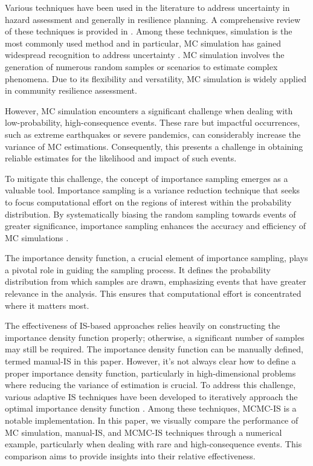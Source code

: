     Various techniques have been used in the literature to address uncertainty in hazard assessment and generally in resilience planning. A comprehensive review of these techniques is provided in \cite{sun_resilience_2020}. Among these techniques, simulation is the most commonly used method \cite{sun_resilience_2020} and in particular, MC simulation has gained widespread recognition to address uncertainty \cite{zheng_bayesian-based_2022, cicilio_electrical_2020, tabandeh_uncertainty_2022, younesi_assessing_2020}. MC simulation involves the generation of numerous random samples or scenarios to estimate complex phenomena. Due to its flexibility and versatility, MC simulation is widely applied in community resilience assessment.

    However, MC simulation encounters a significant challenge when dealing with low-probability, high-consequence events. These rare but impactful occurrences, such as extreme earthquakes or severe pandemics, can considerably increase the variance of MC estimations. Consequently, this presents a challenge in obtaining reliable estimates for the likelihood and impact of such events.
    
    To mitigate this challenge, the concept of importance sampling emerges as a valuable tool. Importance sampling is a variance reduction technique that seeks to focus computational effort on the regions of interest within the probability distribution. By systematically biasing the random sampling towards events of greater significance, importance sampling enhances the accuracy and efficiency of MC simulations \cite{melchers_importance_1989, heinkenschloss_conditional-value-at-risk_2018}.
    
    The importance density function, a crucial element of importance sampling, plays a pivotal role in guiding the sampling process. It defines the probability distribution from which samples are drawn, emphasizing events that have greater relevance in the analysis. This ensures that computational effort is concentrated where it matters most.

    The effectiveness of IS-based approaches relies heavily on constructing the importance density function properly; otherwise, a significant number of samples may still be required. The importance density function can be manually defined, termed manual-IS in this paper. However, it's not always clear how to define a proper importance density function, particularly in high-dimensional problems where reducing the variance of estimation is crucial. To address this challenge, various adaptive IS techniques have been developed to iteratively approach the optimal importance density function \cite{tomasson_improved_2017, depina_coupling_2017, ching_efficient_2009, chaudhuri_information_2020, aslam_ansari_data-driven_2020}. Among these techniques, MCMC-IS is a notable implementation. In this paper, we visually compare the performance of MC simulation, manual-IS, and MCMC-IS techniques through a numerical example, particularly when dealing with rare and high-consequence events. This comparison aims to provide insights into their relative effectiveness.